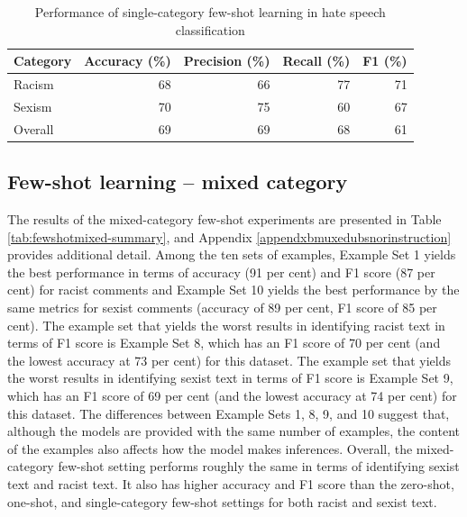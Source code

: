 \documentclass[12pt,]{article}
\begin{document}
\begin{table}

\caption{\label{tab:fewshotsingle-summary}Performance of single-category few-shot learning in hate speech classification}
\centering
\begin{tabular}[t]{lrrrr}
\toprule
Category & Accuracy (\%) & Precision (\%) & Recall (\%) & F1 (\%)\\
\midrule
Racism & 68 & 66 & 77 & 71\\
Sexism & 70 & 75 & 60 & 67\\
Overall & 69 & 69 & 68 & 61\\
\bottomrule
\end{tabular}
\end{table}

\hypertarget{few-shot-learning-mixed-category}{%
\subsection{Few-shot learning -- mixed category}\label{few-shot-learning-mixed-category}}

The results of the mixed-category few-shot experiments are presented in Table \ref{tab:fewshotmixed-summary}, and Appendix \ref{appendxbmuxedubsnorinstruction} provides additional detail. Among the ten sets of examples, Example Set 1 yields the best performance in terms of accuracy (91 per cent) and F1 score (87 per cent) for racist comments and Example Set 10 yields the best performance by the same metrics for sexist comments (accuracy of 89 per cent, F1 score of 85 per cent). The example set that yields the worst results in identifying racist text in terms of F1 score is Example Set 8, which has an F1 score of 70 per cent (and the lowest accuracy at 73 per cent) for this dataset. The example set that yields the worst results in identifying sexist text in terms of F1 score is Example Set 9, which has an F1 score of 69 per cent (and the lowest accuracy at 74 per cent) for this dataset. The differences between Example Sets 1, 8, 9, and 10 suggest that, although the models are provided with the same number of examples, the content of the examples also affects how the model makes inferences. Overall, the mixed-category few-shot setting performs roughly the same in terms of identifying sexist text and racist text. It also has higher accuracy and F1 score than the zero-shot, one-shot, and single-category few-shot settings for both racist and sexist text.
\end{document}
